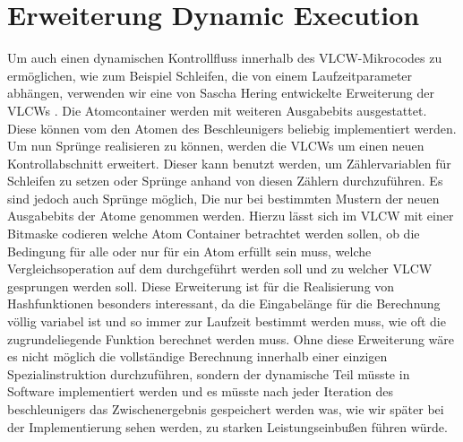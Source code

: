 \section{Erweiterung Dynamic Execution}
Um auch einen dynamischen Kontrollfluss innerhalb des VLCW-Mikrocodes zu ermöglichen, wie zum Beispiel Schleifen, die von einem Laufzeitparameter abhängen,
verwenden wir eine von Sascha Hering entwickelte Erweiterung der VLCWs . Die Atomcontainer werden mit  weiteren Ausgabebits ausgestattet.
Diese können vom den Atomen des Beschleunigers beliebig implementiert werden. Um nun Sprünge realisieren zu können, werden die VLCWs um einen neuen Kontrollabschnitt erweitert.
Dieser kann benutzt werden, um Zählervariablen für Schleifen zu setzen oder Sprünge anhand von diesen Zählern durchzuführen. Es sind jedoch auch Sprünge möglich,
Die nur bei bestimmten Mustern der neuen Ausgabebits der Atome genommen werden. Hierzu lässt sich im VLCW mit einer Bitmaske codieren welche Atom Container betrachtet werden sollen,
ob die Bedingung für alle oder nur für ein Atom erfüllt sein muss, welche Vergleichsoperation auf dem  durchgeführt werden soll und
zu welcher VLCW gesprungen werden soll. Diese Erweiterung ist für die Realisierung von Hashfunktionen besonders interessant, da die Eingabelänge für die Berechnung völlig variabel ist
und so immer zur Laufzeit bestimmt werden muss, wie oft die zugrundeliegende Funktion berechnet werden muss. Ohne diese Erweiterung wäre es nicht möglich die vollständige Berechnung innerhalb einer einzigen
Spezialinstruktion durchzuführen, sondern der dynamische Teil müsste in Software implementiert werden und es müsste nach jeder Iteration des beschleunigers das Zwischenergebnis gespeichert werden was,
wie wir später bei der Implementierung sehen werden, zu starken Leistungseinbußen führen würde.